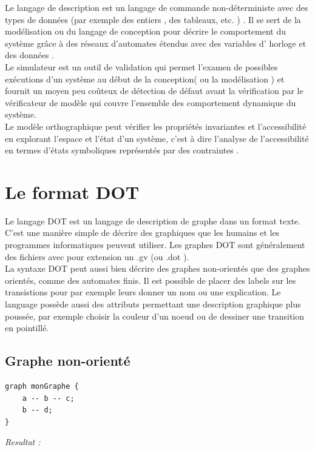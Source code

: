 \documentclass[12pt,a4paper]{report}
\begin{document}
  Le langage de description est un langage de commande non-déterministe avec des types de données (par exemple des entiers , des tableaux, etc. ) . Il se sert de la modélisation ou du langage de conception pour décrire le comportement du système grâce à des réseaux d'automates étendus avec des variables d' horloge et des données .\\ 

  Le simulateur est un outil de validation qui permet l'examen de possibles exécutions d'un système au début de la conception( ou la modélisation ) et fournit un moyen peu coûteux de détection de défaut avant la vérification par le vérificateur de modèle qui couvre l'ensemble des comportement dynamique du système.\\

  Le modèle orthographique peut vérifier les propriétés invariantes et l'accessibilité en explorant l'espace et l'état d'un système, c'est à dire l'analyse de l'accessibilité en termes d'états symboliques représentés par des contraintes .

\section{Le format DOT}

  Le langage DOT est un langage de description de graphe dans un format texte. C'est une manière simple de décrire des graphiques que les humains et les programmes informatiques peuvent utiliser. Les graphes DOT sont généralement des fichiers avec pour extension un .gv (ou .dot ).\\

  La syntaxe DOT peut aussi bien décrire des graphes non-orientés que des graphes orientés, comme des automates finis.
  Il est possible de placer des labels sur les transistions pour par exemple leurs donner un nom ou une explication. Le language possède aussi des attributs permettant une description graphique plus poussée, par exemple choisir la couleur d'un noeud ou de dessiner une transition en pointillé.

\subsection{Graphe non-orienté}

\begin{lstlisting}
graph monGraphe {
    a -- b -- c;
    b -- d;
}
\end{lstlisting}

  \textit{Resultat : }
\end{document}
